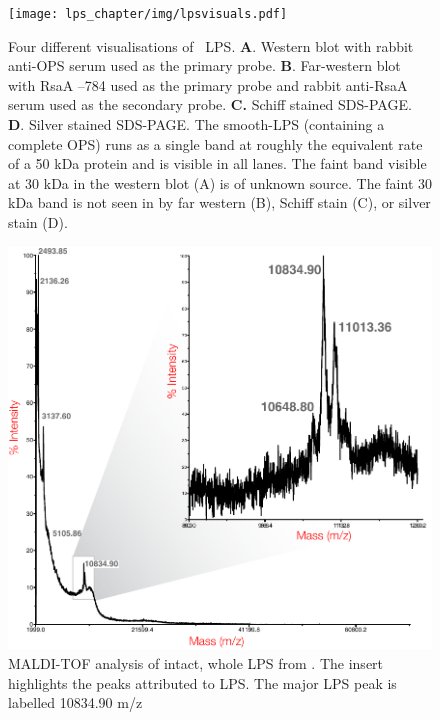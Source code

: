   \begin{figure}[htp]
    \begin{center}
      \texttt{[image: lps\_chapter/img/lpsvisuals.pdf]}
    \end{center}
    \caption[Four different visualisations of \caulobacter\ \ac{LPS}]{Four different visualisations
      of \caulobacter\ \ac{LPS}. \textbf{A}. Western blot with rabbit anti-\ac{OPS} serum used as
      the primary probe. \textbf{B}. Far-western blot with RsaA --784 used as the primary
      probe and rabbit anti-RsaA serum used as the secondary probe. \textbf{C.} Schiff stained
      \ac{SDS-PAGE}. \textbf{D}. Silver stained \ac{SDS-PAGE}. The smooth-\ac{LPS} (\ie containing a
      complete \ac{OPS}) runs as a single band at roughly the equivalent rate of a 50 kDa protein
      and is visible in all lanes. The faint band visible at 30 kDa in the western blot (A) is of
      unknown source. The faint 30 kDa band is not seen in by far western (B), Schiff stain (C), or
      silver stain (D).}
    \label{fig:lpsvisuals}
  \end{figure}

  \begin{figure}[htb]
    \begin{center}
      \includegraphics[]{lps_chapter/img/malditof.pdf}
    \end{center}
    \caption[\Ac{MALDI-TOF} analysis of intact, whole \ac{LPS} from \caulobacter]{\ac{MALDI-TOF}
      analysis of intact, whole \ac{LPS} from \caulobacter. The insert highlights the peaks
      attributed to \ac{LPS}. The major \ac{LPS} peak is labelled 10834.90 m/z}
    \label{fig:lpsmalditof}
  \end{figure}

